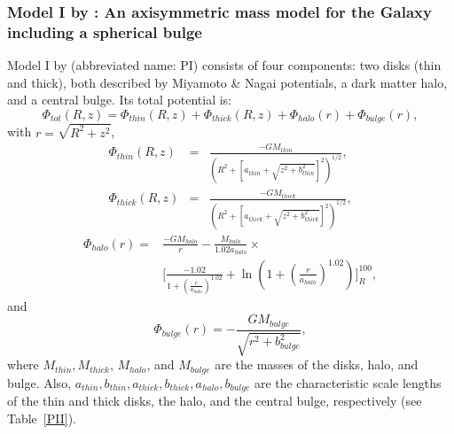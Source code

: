     \subsubsection{Model I by \citet{2017A&A...598A..66P}: An axisymmetric mass model for the Galaxy including a spherical bulge}
        Model I by \citet{2017A&A...598A..66P} (abbreviated name: PI) consists of four components: two disks (thin and thick), both described by Miyamoto \& Nagai potentials, a dark matter halo, and a central bulge. Its total potential is:
        \begin{equation}
            \Phi_{tot}(R, z) = \Phi_{thin}(R, z) + \Phi_{thick}(R, z) + \Phi_{halo}(r)+  \Phi_{bulge}(r),
        \end{equation}
        with $r=\sqrt{R^2 + z^2}$,
        \begin{eqnarray}
            \Phi_{thin}(R,z)&=&\frac{-GM_{thin}}{\left(R^2+\left[a_{thin}+\sqrt{z^2+b_{thin}^2}\right]^2\right)^{1/2}},\\
            \Phi_{thick}(R,z)&=&\frac{-GM_{thick}}{\left(R^2+\left[a_{thick}+\sqrt{z^2+b_{thick}^2}\right]^2\right)^{1/2}},
        \end{eqnarray}
        \begin{equation}
            \begin{split}
                \Phi_{halo}(r)=&\frac{-GM_{halo}}{r}-\frac{M_{halo}}{1.02a_{halo}}\times\\
                & \Bigg[\frac{-1.02}{1+\left(\frac{r}{a_{halo}}\right)^{1.02}}+\ln{(1+\left(\frac{r}{a_{halo}}\right)^{1.02})}\Bigg]_R^{100},
            \end{split}
        \end{equation}
        and 
        \begin{equation}
            \Phi_{bulge}(r) = -\frac{GM_{bulge}}{\sqrt{r^2+{b_{bulge}^2}}},
        \end{equation}
        where $M_{thin}, M_{thick}$, $M_{halo}$, and $M_{bulge}$ are the masses of the disks, halo, and bulge. Also, $a_{thin}, b_{thin},  a_{thick}, b_{thick}, a_{halo} ,b_{bulge}$ are the characteristic scale lengths of the thin and thick disks, the halo, and the central bulge, respectively (see Table~\ref{PII}).

